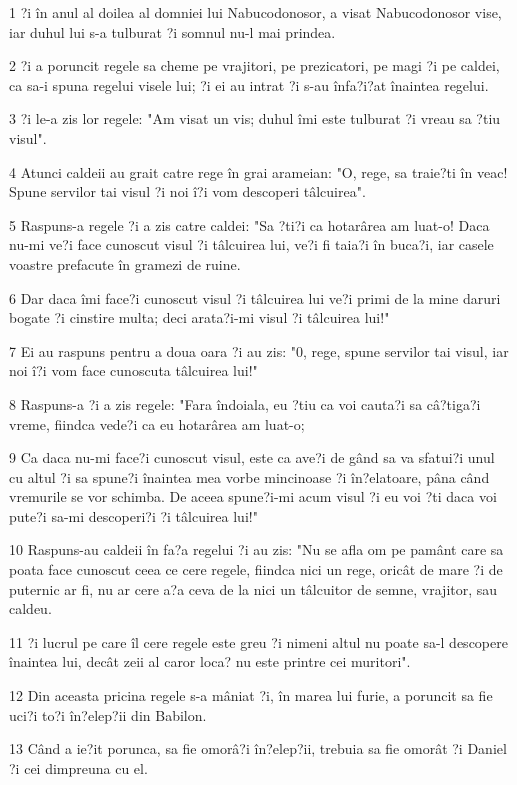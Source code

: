 \par 1 ?i în anul al doilea al domniei lui Nabucodonosor, a visat Nabucodonosor vise, iar duhul lui s-a tulburat ?i somnul nu-l mai prindea.
\par 2 ?i a poruncit regele sa cheme pe vrajitori, pe prezicatori, pe magi ?i pe caldei, ca sa-i spuna regelui visele lui; ?i ei au intrat ?i s-au înfa?i?at înaintea regelui.
\par 3 ?i le-a zis lor regele: "Am visat un vis; duhul îmi este tulburat ?i vreau sa ?tiu visul".
\par 4 Atunci caldeii au grait catre rege în grai arameian: "O, rege, sa traie?ti în veac! Spune servilor tai visul ?i noi î?i vom descoperi tâlcuirea".
\par 5 Raspuns-a regele ?i a zis catre caldei: "Sa ?ti?i ca hotarârea am luat-o! Daca nu-mi ve?i face cunoscut visul ?i tâlcuirea lui, ve?i fi taia?i în buca?i, iar casele voastre prefacute în gramezi de ruine.
\par 6 Dar daca îmi face?i cunoscut visul ?i tâlcuirea lui ve?i primi de la mine daruri bogate ?i cinstire multa; deci arata?i-mi visul ?i tâlcuirea lui!"
\par 7 Ei au raspuns pentru a doua oara ?i au zis: "0, rege, spune servilor tai visul, iar noi î?i vom face cunoscuta tâlcuirea lui!"
\par 8 Raspuns-a ?i a zis regele: "Fara îndoiala, eu ?tiu ca voi cauta?i sa câ?tiga?i vreme, fiindca vede?i ca eu hotarârea am luat-o;
\par 9 Ca daca nu-mi face?i cunoscut visul, este ca ave?i de gând sa va sfatui?i unul cu altul ?i sa spune?i înaintea mea vorbe mincinoase ?i în?elatoare, pâna când vremurile se vor schimba. De aceea spune?i-mi acum visul ?i eu voi ?ti daca voi pute?i sa-mi descoperi?i ?i tâlcuirea lui!"
\par 10 Raspuns-au caldeii în fa?a regelui ?i au zis: "Nu se afla om pe pamânt care sa poata face cunoscut ceea ce cere regele, fiindca nici un rege, oricât de mare ?i de puternic ar fi, nu ar cere a?a ceva de la nici un tâlcuitor de semne, vrajitor, sau caldeu.
\par 11 ?i lucrul pe care îl cere regele este greu ?i nimeni altul nu poate sa-l descopere înaintea lui, decât zeii al caror loca? nu este printre cei muritori".
\par 12 Din aceasta pricina regele s-a mâniat ?i, în marea lui furie, a poruncit sa fie uci?i to?i în?elep?ii din Babilon.
\par 13 Când a ie?it porunca, sa fie omorâ?i în?elep?ii, trebuia sa fie omorât ?i Daniel ?i cei dimpreuna cu el.
